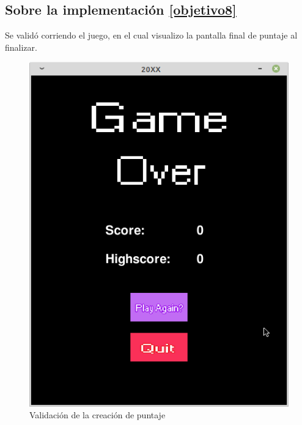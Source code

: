 \documentclass[12pt,letterpaper]{article}
\begin{document}
\subsection{Sobre la implementación \ref{objetivo8}}
Se validó corriendo el juego, en el cual visualizo la pantalla final de puntaje al finalizar.
\begin{figure}[H]
    \centering
    \includegraphics[width=0.7\linewidth]{score.png}
    \caption{Validación de la creación de puntaje}
    \label{05}
\end{figure}
\newpage
\end{document}
